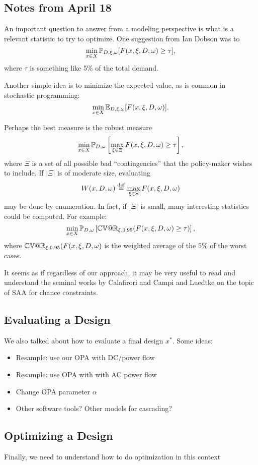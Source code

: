 \subsection{Notes from April 18}

An important question to answer from a modeling perspective is what is
a relevant statistic to try to optimize.  One suggestion from Ian
Dobson was to 
\[ \min_{x \in X} \mathbb{P}_{D,\xi,\omega} [F(x,\xi,D,\omega) \geq
  \tau], \]
where $\tau$ is something like 5\% of the total demand.

Another simple idea is to minimize the expected value, as is common in
stochastic programming:
\[ \min_{x \in X} \mathbb{E}_{D,\xi,\omega} [F(x,\xi,D,\omega)]. \]

Perhaps the best measure is the robust measure
\[ \min_{x \in X} \mathbb{P}_{D,\omega} \left[ \max_{\xi \in \Xi}
  F(x,\xi,D,\omega) \geq \tau \right], \]
where $\Xi$ is a set of all possible bad ``contingencies'' that the
policy-maker wishes to include.  If $|\Xi|$ is of moderate size,
evaluating 
\[ W(x,D,\omega) \stackrel{\rm def}{=} \max_{\xi \in \Xi} F(x,\xi,D,\omega) \]
may be done by enumeration.
In fact, if $|\Xi|$ is small, many interesting statistics could be
computed.  For example:
\[ \min_{x \in X} \mathbb{P}_{D, \omega} \left[ \mathbb{CV}{\mathsf @}\mathbb{R}_{\xi,0.95}
  (F(x,\xi,D,\omega) \geq \tau) \right], \]
where $\mathbb{CV}{\mathsf @}\mathbb{R}_{\xi,0.95} (F(x,\xi,D,\omega)$ is the weighted average of
the $5\%$ of the worst cases.

It seems as if regardless of our approach, it may be very useful to
read and understand the seminal works by Calafirori and Campi and
Luedtke on the topic of SAA for chance constraints.


\subsection{Evaluating a Design}
We also talked about how to evaluate a final design $x^*$.  Some ideas:

\begin{itemize}
\item Resample: use our OPA with DC/power flow
\item Resample: use OPA with with AC power flow
\item Change OPA parameter $\alpha$
\item Other software tools?  Other models for cascading?
\end{itemize}

\subsection{Optimizing a Design}
Finally, we need to understand how to do optimization in this context

